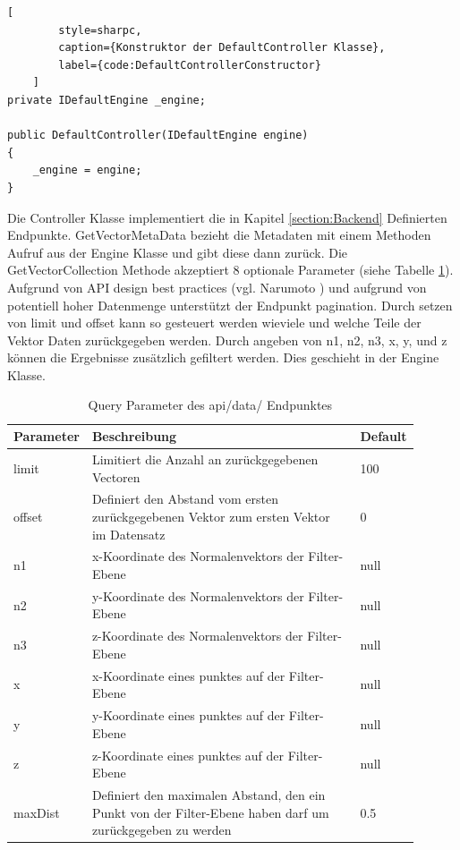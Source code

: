 \begin{codeblock}
	\begin{lstlisting}[
		style=sharpc,
		caption={Konstruktor der DefaultController Klasse},
		label={code:DefaultControllerConstructor}
	]
private IDefaultEngine _engine;

public DefaultController(IDefaultEngine engine)
{
	_engine = engine;
}
	\end{lstlisting}
\end{codeblock}

Die Controller Klasse implementiert die in Kapitel \ref{section:Backend}
Definierten Endpunkte. GetVectorMetaData bezieht die Metadaten mit einem
Methoden Aufruf aus der Engine Klasse und gibt diese dann zurück.
Die GetVectorCollection Methode akzeptiert 8 optionale Parameter
(siehe Tabelle \ref{tab:EndpointQueryParameters}). Aufgrund von API
design best practices (vgl. Narumoto \cite{ApiDesignBestPractices})
und aufgrund von potentiell hoher Datenmenge unterstützt der Endpunkt
pagination. Durch setzen von limit und offset kann so gesteuert werden
wieviele und welche Teile der Vektor Daten zurückgegeben werden.
Durch angeben von n1, n2, n3, x, y, und z können die Ergebnisse
zusätzlich gefiltert werden. Dies geschieht in der Engine Klasse.

\begin{table}
	\centering
	\begin{tabular}[h]{p{0.11\linewidth} | p{0.7\linewidth}| p{0.09\linewidth}}
	Parameter & Beschreibung & Default \\
	\hline
	limit & Limitiert die Anzahl an zurückgegebenen Vectoren & 100\\
	offset & Definiert den Abstand vom ersten zurückgegebenen Vektor zum ersten Vektor im Datensatz & 0\\
	n1 & x-Koordinate des Normalenvektors der Filter-Ebene & null\\
	n2 & y-Koordinate des Normalenvektors der Filter-Ebene & null\\
	n3 & z-Koordinate des Normalenvektors der Filter-Ebene & null\\
	x & x-Koordinate eines punktes auf der Filter-Ebene & null\\
	y & y-Koordinate eines punktes auf der Filter-Ebene & null\\
	z & z-Koordinate eines punktes auf der Filter-Ebene & null\\
	maxDist & Definiert den maximalen Abstand, den ein Punkt von der Filter-Ebene haben darf um zurückgegeben zu werden & 0.5\\
	\end{tabular}
	\caption{Query Parameter des api/data/ Endpunktes}
	\label{tab:EndpointQueryParameters}
\end{table}

